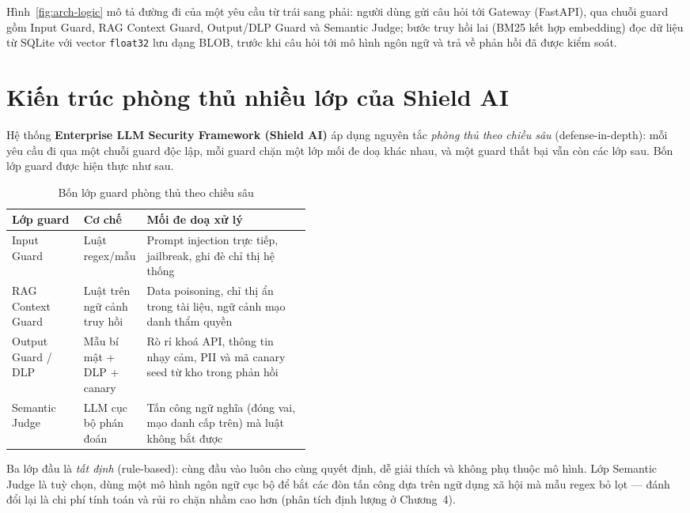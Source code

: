 Hình~\ref{fig:arch-logic} mô tả đường đi của một yêu cầu từ trái sang phải: người
dùng gửi câu hỏi tới Gateway (FastAPI), qua chuỗi guard gồm Input Guard, RAG
Context Guard, Output/DLP Guard và Semantic Judge; bước truy hồi lai (BM25 kết
hợp embedding) đọc dữ liệu từ SQLite với vector \texttt{float32} lưu dạng BLOB,
trước khi câu hỏi tới mô hình ngôn ngữ và trả về phản hồi đã được kiểm soát.

\section{Kiến trúc phòng thủ nhiều lớp của Shield AI}

Hệ thống \textbf{Enterprise LLM Security Framework (Shield AI)} áp dụng nguyên
tắc \emph{phòng thủ theo chiều sâu} (defense-in-depth): mỗi yêu cầu đi qua một
chuỗi guard độc lập, mỗi guard chặn một lớp mối đe doạ khác nhau, và một guard
thất bại vẫn còn các lớp sau. Bốn lớp guard được hiện thực như sau.

\begin{table}[H]
\centering
\caption{Bốn lớp guard phòng thủ theo chiều sâu}
\label{tab:guard-layers}
\begin{tabularx}{\linewidth}{@{}p{0.24\linewidth}p{0.20\linewidth}X@{}}
\toprule
\textbf{Lớp guard} & \textbf{Cơ chế} & \textbf{Mối đe doạ xử lý} \\
\midrule
Input Guard & Luật regex/mẫu & Prompt injection trực tiếp, jailbreak, ghi đè chỉ thị hệ thống \\
RAG Context Guard & Luật trên ngữ cảnh truy hồi & Data poisoning, chỉ thị ẩn trong tài liệu, ngữ cảnh mạo danh thẩm quyền \\
Output Guard / DLP & Mẫu bí mật + DLP + canary & Rò rỉ khoá API, thông tin nhạy cảm, PII và mã canary seed từ kho trong phản hồi \\
Semantic Judge & LLM cục bộ phán đoán & Tấn công ngữ nghĩa (đóng vai, mạo danh cấp trên) mà luật không bắt được \\
\bottomrule
\end{tabularx}
\end{table}

Ba lớp đầu là \emph{tất định} (rule-based): cùng đầu vào luôn cho cùng quyết
định, dễ giải thích và không phụ thuộc mô hình. Lớp Semantic Judge là tuỳ chọn,
dùng một mô hình ngôn ngữ cục bộ để bắt các đòn tấn công dựa trên ngữ dụng xã
hội mà mẫu regex bỏ lọt --- đánh đổi lại là chi phí tính toán và rủi ro chặn
nhầm cao hơn (phân tích định lượng ở Chương~4).

